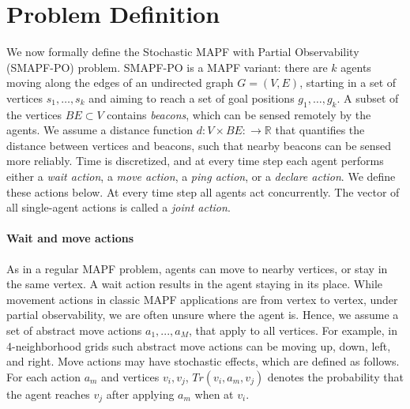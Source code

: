 \documentclass[letterpaper]{article} %
\begin{document}






\section{Problem Definition}

We now formally define the Stochastic MAPF with Partial Observability (SMAPF-PO) problem. 
SMAPF-PO is a MAPF variant: there are $k$ agents moving along the edges of an undirected graph $G=(V,E)$, starting in a set of vertices $s_1,\ldots, s_k$ and 
aiming to reach a set of goal positions $g_1,\ldots, g_k$.
A subset of the vertices $BE\subset V$ contains \emph{beacons}, which can be sensed remotely by the agents. 
We assume a distance function $d:V\times BE:\rightarrow\mathbb{R}$ that quantifies the distance between vertices and beacons, such that nearby beacons can be sensed more reliably. Time is discretized, and at every time step each agent performs either a \emph{wait action}, a \emph{move action}, a \emph{ping action}, or a \emph{declare action}. We define these actions below. 
At every time step all agents act concurrently. The vector of all single-agent actions is called a \emph{joint action}. 

\paragraph{Wait and move actions} As in a regular MAPF problem, agents can move to nearby vertices, or stay in the same vertex.
A wait action results in the agent staying in its place.
While movement actions in classic MAPF applications are from vertex to vertex, under partial observability, we are often unsure where the agent is. Hence, we assume a set of abstract move actions $a_1,...,a_M$, that apply to all vertices. 
For example, in 4-neighborhood grids such abstract move actions can be moving up, down, left, and right.  
Move actions may have stochastic effects, which are defined as follows. 
For each action $a_m$ and vertices $v_i,v_j$, $Tr(v_i,a_m,v_j)$ denotes the probability that the agent reaches $v_j$ after applying $a_m$ when at $v_i$. 

\end{document}
